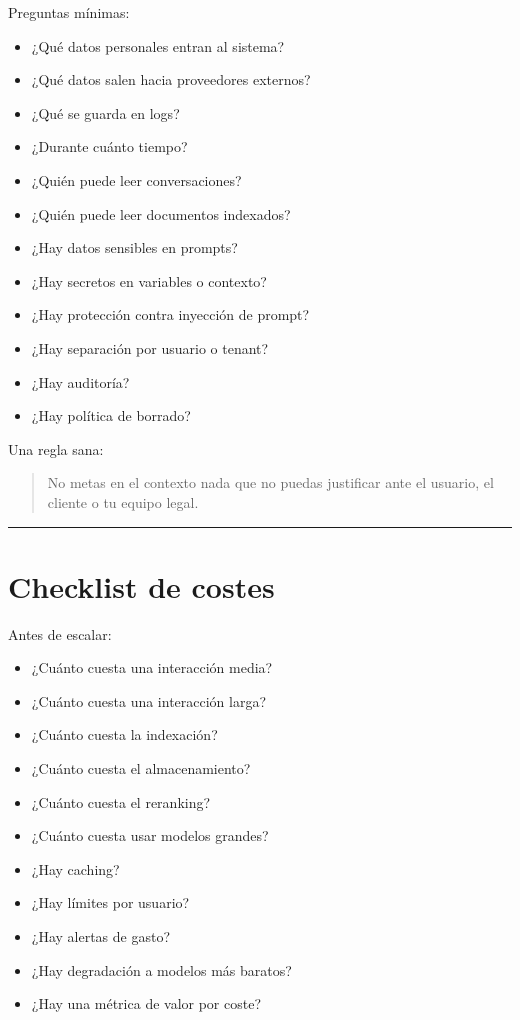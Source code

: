 Preguntas mínimas:

\begin{itemize}
\tightlist
\item
  ¿Qué datos personales entran al sistema?
\item
  ¿Qué datos salen hacia proveedores externos?
\item
  ¿Qué se guarda en logs?
\item
  ¿Durante cuánto tiempo?
\item
  ¿Quién puede leer conversaciones?
\item
  ¿Quién puede leer documentos indexados?
\item
  ¿Hay datos sensibles en prompts?
\item
  ¿Hay secretos en variables o contexto?
\item
  ¿Hay protección contra inyección de prompt?
\item
  ¿Hay separación por usuario o tenant?
\item
  ¿Hay auditoría?
\item
  ¿Hay política de borrado?
\end{itemize}

Una regla sana:

\begin{quote}
No metas en el contexto nada que no puedas justificar ante el usuario,
el cliente o tu equipo legal.
\end{quote}

\begin{center}\rule{0.5\linewidth}{0.5pt}\end{center}

\section{Checklist de costes}\label{checklist-de-costes}

Antes de escalar:

\begin{itemize}
\tightlist
\item
  ¿Cuánto cuesta una interacción media?
\item
  ¿Cuánto cuesta una interacción larga?
\item
  ¿Cuánto cuesta la indexación?
\item
  ¿Cuánto cuesta el almacenamiento?
\item
  ¿Cuánto cuesta el reranking?
\item
  ¿Cuánto cuesta usar modelos grandes?
\item
  ¿Hay caching?
\item
  ¿Hay límites por usuario?
\item
  ¿Hay alertas de gasto?
\item
  ¿Hay degradación a modelos más baratos?
\item
  ¿Hay una métrica de valor por coste?
\end{itemize}

